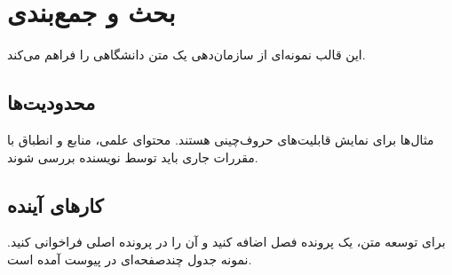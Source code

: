 \chapter{بحث و جمع‌بندی}
این قالب نمونه‌ای از سازمان‌دهی یک متن دانشگاهی را فراهم می‌کند.
\section{محدودیت‌ها}
مثال‌ها برای نمایش قابلیت‌های حروف‌چینی هستند. محتوای علمی، منابع و انطباق با مقررات جاری باید توسط نویسنده بررسی شوند.
\section{کارهای آینده}
برای توسعه متن، یک پرونده فصل اضافه کنید و آن را در پرونده اصلی فراخوانی کنید. نمونه جدول چندصفحه‌ای در پیوست آمده است.
